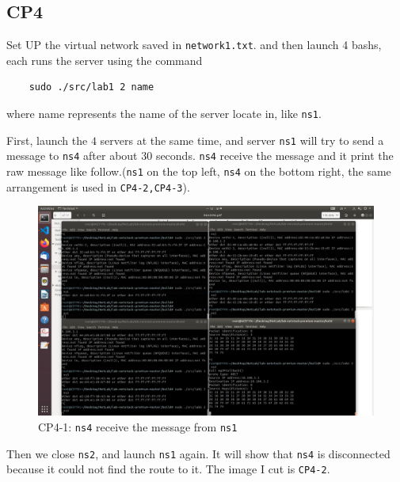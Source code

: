 \documentclass[11pt]{article}
\begin{document}
	\subsection*{CP4}
	
	\par Set UP the virtual network saved in \texttt{network1.txt}. and then launch 4 bashs, each runs the server using the command
	
	\begin{lstlisting}
	sudo ./src/lab1 2 name
	\end{lstlisting}
	
	\par where name represents the name of the server locate in, like \texttt{ns1}.
	
	\par First, launch the $4$ servers at the same time, and server \texttt{ns1} will try to send a message to \texttt{ns4} after about $30$ seconds. \texttt{ns4} receive the message and it print the raw message like follow.(\texttt{ns1} on the top left, \texttt{ns4} on the bottom right, the same arrangement is used in \texttt{CP4-2,CP4-3}).
	
	\begin{figure}[htbp]
		\centering
		\includegraphics[width=0.9\linewidth]{../lab-netstack-premium-master/checkpoints/CP4-1.png}
		\caption{CP4-1: \texttt{ns4} receive the message from \texttt{ns1}}
		\label{fig:CP4-1}
	\end{figure}
	
	\par Then we close \texttt{ns2}, and launch \texttt{ns1} again. It will show that \texttt{ns4} is disconnected because it could not find the route to it. The image I cut is \texttt{CP4-2}.
	
\end{document}
